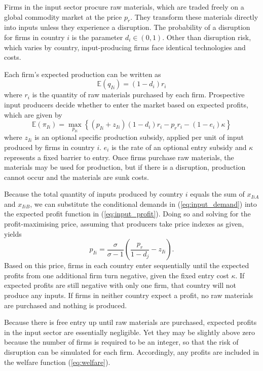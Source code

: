 \documentclass{article}
\begin{document}
Firms in the input sector procure raw materials, which are traded freely on a global commodity market at the price $p_r$. They transform these materials directly into inputs unless they experience a disruption. The probability of a disruption for firms in country $i$ is the parameter $d_i \in (0, 1)$. Other than disruption risk, which varies by country, input-producing firms face identical technologies and costs.

Each firm's expected production can be written as
\begin{equation}
    \mathbb{E} (q_{Ii}) = (1 - d_i) r_i
\end{equation}
where $r_i$ is the quantity of raw materials purchased by each firm. Prospective input producers decide whether to enter the market based on expected profits, which are given by
\begin{equation} \label{eq:input_profit}
    \mathbb{E} (\pi_{Ii}) = \max_{p_{Ii}} \left\{ (p_{Ii} + z_{Ii}) (1 - d_i) r_{i} - p_r r_i - (1 - e_i) \kappa \right\}
\end{equation}
where $z_{Ii}$ is an optional specific production subsidy, applied per unit of input produced by firms in country $i$. $e_i$ is the rate of an optional entry subsidy and $\kappa$ represents a fixed barrier to entry. Once firms purchase raw materials, the materials may be used for production, but if there is a disruption, production cannot occur and the materials are sunk costs.

Because the total quantity of inputs produced by country $i$ equals the sum of $x_{IiA}$ and $x_{IiB}$, we can substitute the conditional demands in (\ref{eq:input_demand}) into the expected profit function in (\ref{eq:input_profit}). Doing so and solving for the profit-maximising price, assuming that producers take price indexes as given, yields
\begin{equation}
    p_{Ii} = \frac{\sigma}{\sigma - 1} \left( \frac{p_r}{1 - d_j} - z_{Ii} \right) .
\end{equation}
Based on this price, firms in each country enter sequentially until the expected profits from one additional firm turn negative, given the fixed entry cost $\kappa$. If expected profits are still negative with only one firm, that country will not produce any inputs. If firms in neither country expect a profit, no raw materials are purchased and nothing is produced.

Because there is free entry up until raw materials are purchased, expected profits in the input sector are essentially negligible. Yet they may be slightly above zero because the number of firms is required to be an integer, so that the risk of disruption can be simulated for each firm. Accordingly, any profits are included in the welfare function (\ref{eq:welfare}).
\end{document}
